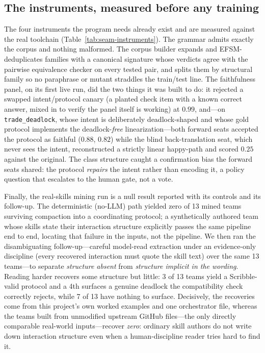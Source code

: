 \documentclass{article}
\begin{document}
\subsection{The instruments, measured before any training}
The four instruments the program needs already exist and are measured against the real toolchain (Table~\ref{tab:seam-instruments}). The grammar admits exactly the corpus and nothing malformed. The corpus builder expands and EFSM-deduplicates families with a canonical signature whose verdicts agree with the pairwise equivalence checker on every tested pair, and splits them by structural family so no paraphrase or mutant straddles the train/test line. The faithfulness panel, on its first live run, did the two things it was built to do: it rejected a swapped intent/protocol canary (a planted check item with a known correct answer, mixed in to verify the panel itself is working) at $0.99$, and---on \texttt{trade\_deadlock}, whose intent is deliberately deadlock-shaped and whose gold protocol implements the deadlock-\emph{free} linearization---both forward seats accepted the protocol as faithful ($0.88$, $0.82$) while the blind back-translation seat, which never sees the intent, reconstructed a strictly linear happy-path and scored $0.25$ against the original. The class structure caught a confirmation bias the forward seats shared: the protocol \emph{repairs} the intent rather than encoding it, a policy question that escalates to the human gate, not a vote. 

Finally, the real-skills mining run is a null result reported with its controls and its follow-up. The deterministic (no-LLM) path yielded zero of 13 mined teams surviving compaction into a coordinating protocol; a synthetically authored team whose skills state their interaction structure explicitly passes the same pipeline end to end, locating that failure in the inputs, not the pipeline. We then ran the disambiguating follow-up---careful model-read extraction under an evidence-only discipline (every recovered interaction must quote the skill text) over the same 13 teams---to separate \emph{structure absent} from \emph{structure implicit in the wording}. Reading harder recovers some structure but little: 3 of 13 teams yield a Scribble-valid protocol and a 4th surfaces a genuine deadlock the compatibility check correctly rejects, while 7 of 13 have nothing to surface. Decisively, the recoveries come from this project's own worked examples and one orchestrator file, whereas the teams built from unmodified upstream GitHub files---the only directly comparable real-world inputs---recover \emph{zero}: ordinary skill authors do not write down interaction structure even when a human-discipline reader tries hard to find it. 
\end{document}
